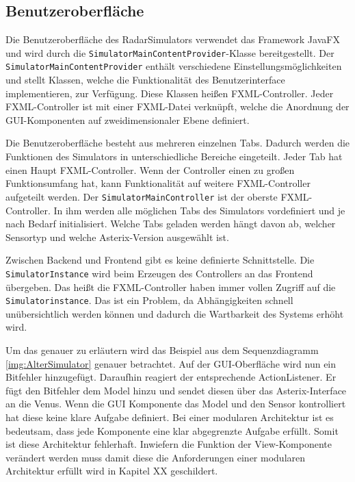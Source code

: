 \subsection{Benutzeroberfläche}

\sloppy
Die Benutzeroberfläche des RadarSimulators verwendet das Framework JavaFX und wird durch die \texttt{SimulatorMainContentProvider}-Klasse bereitgestellt. Der \texttt{SimulatorMainContentProvider} enthält verschiedene Einstellungsmöglichkeiten und stellt Klassen, welche die Funktionalität des   Benutzerinterface implementieren, zur Verfügung. Diese Klassen heißen FXML-Controller. Jeder FXML-Controller ist mit einer FXML-Datei verknüpft, welche die Anordnung der GUI-Komponenten auf zweidimensionaler Ebene definiert. 

Die Benutzeroberfläche besteht aus mehreren einzelnen Tabs. Dadurch werden die Funktionen des Simulators in unterschiedliche Bereiche eingeteilt. Jeder Tab hat einen Haupt FXML-Controller. Wenn der Controller einen zu großen Funktionsumfang hat, kann Funktionalität auf weitere FXML-Controller aufgeteilt werden. Der \texttt{SimulatorMainController} ist der oberste FXML-Controller. In ihm werden alle möglichen Tabs des Simulators vordefiniert und je nach Bedarf initialisiert. Welche Tabs geladen werden hängt davon ab, welcher Sensortyp und welche Asterix-Version ausgewählt ist. 

Zwischen Backend und Frontend gibt es keine definierte Schnittstelle. Die \texttt{Simulator\allowbreak Instance} wird beim Erzeugen des Controllers an das Frontend übergeben. Das heißt die FXML-Controller haben immer vollen Zugriff auf die \texttt{Simulatorinstance}. Das ist ein Problem, da Abhängigkeiten schnell unübersichtlich werden können und dadurch die Wartbarkeit des Systems erhöht wird.

Um das genauer zu erläutern wird das Beispiel aus dem Sequenzdiagramm \ref{img:AlterSimulator} genauer betrachtet. Auf der GUI-Oberfläche wird nun ein Bitfehler hinzugefügt. Daraufhin reagiert der entsprechende ActionListener. Er fügt den Bitfehler dem Model hinzu und sendet diesen über das Asterix-Interface an die Venus. Wenn die GUI Komponente das Model und den Sensor kontrolliert hat diese keine klare Aufgabe definiert. Bei einer modularen Architektur ist es bedeutsam, dass jede Komponente eine klar abgegrenzte Aufgabe \cite{modularSoftware} erfüllt. Somit ist diese Architektur fehlerhaft. Inwiefern die Funktion der View-Komponente verändert werden muss damit diese die Anforderungen einer modularen Architektur erfüllt wird in Kapitel XX geschildert.


